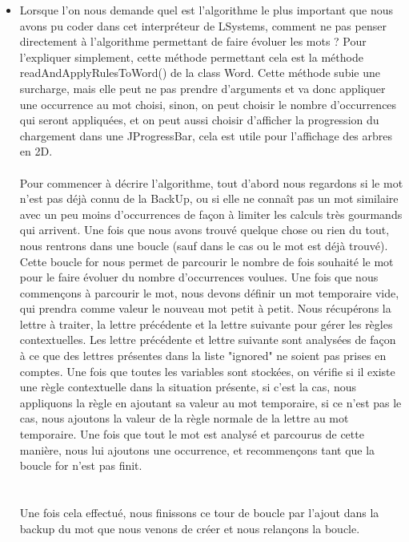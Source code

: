 \documentclass[a4paper,12pt]{article}
\begin{document}
\begin{itemize}[label=\textbullet, font=\small]
    \\
    \item Lorsque l'on nous demande quel est l'algorithme le plus important que nous avons pu coder dans cet interpréteur de LSystems, comment ne pas penser directement à l'algorithme permettant de faire évoluer les mots ? Pour l'expliquer simplement, cette méthode permettant cela est la méthode readAndApplyRulesToWord() de la class Word. Cette méthode subie une surcharge, mais elle peut ne pas prendre d'arguments et va donc appliquer une occurrence au mot choisi, sinon, on peut choisir le nombre d'occurrences qui seront appliquées, et on peut aussi choisir d'afficher la progression du chargement dans une JProgressBar, cela est utile pour l'affichage des arbres en 2D. 
    \\\\
    Pour commencer à décrire l'algorithme, tout d'abord nous regardons si le mot n'est pas déjà connu de la BackUp, ou si elle ne connaît pas un mot similaire avec un peu moins d'occurrences de façon à limiter les calculs très gourmands qui arrivent. Une fois que nous avons trouvé quelque chose ou rien du tout, nous rentrons dans une boucle (sauf dans le cas ou le mot est déjà trouvé). Cette boucle for nous permet de parcourir le nombre de fois souhaité le mot pour le faire évoluer du nombre d'occurrences voulues. Une fois que nous commençons à parcourir le mot, nous devons définir un mot temporaire vide, qui prendra comme valeur le nouveau mot petit à petit. Nous récupérons la lettre à traiter, la lettre précédente et la lettre suivante pour gérer les règles contextuelles. Les lettre précédente et lettre suivante sont analysées de façon à ce que des lettres présentes dans la liste "ignored" ne soient pas prises en comptes. Une fois que toutes les variables sont stockées, on vérifie si il existe une règle contextuelle dans la situation présente, si c'est la cas, nous appliquons la règle en ajoutant sa valeur au mot temporaire, si ce n'est pas le cas, nous ajoutons la valeur de la règle normale de la lettre au mot temporaire. Une fois que tout le mot est analysé et parcourus de cette manière, nous lui ajoutons une occurrence, et recommençons tant que la boucle for n'est pas finit. 
\\\\\\
    Une fois cela effectué, nous finissons ce tour de boucle par l'ajout dans la backup du mot que nous venons de créer et nous relançons la boucle.
    \\
\end{itemize}
\end{document}
